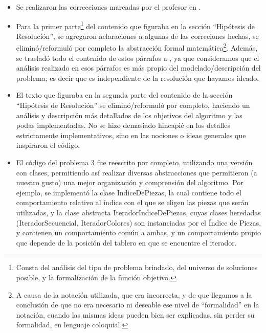 \documentclass[11pt, a4paper, twoside]{article}
\begin{document}
\begin{itemize}[leftmargin=+4em]

    \item Se realizaron las correcciones marcadas por el profesor en
.

    \item Para la primer parte\footnote{ Consta del análisis del tipo de
problema brindado, del universo de soluciones posible, y la formalización de la
función objetivo.} del contenido que figuraba en la sección ``Hipótesis de
Resolución'', se agregaron aclaraciones a algunas de las correciones hechas, se
eliminó/reformuló por completo la abstracción formal matemática\footnote{ A
causa de la notación utilizada, que era incorrecta, y de que llegamos a la
conclusión de que no era necesario ni deseable ese nivel de ``formalidad'' en la
notación, cuando las mismas ideas pueden bien ser explicadas, sin perder su
formalidad, en lenguaje coloquial.}. Además, se trasladó todo el contenido de
estos párrafos a , ya que consideramos que
el análisis realizado en esos párrafos es más propio del modelado/descripción
del problema; es decir que es independiente de la resolución que hayamos ideado.
    
    \item El texto que figuraba en la segunda parte del contenido de la sección
``Hipótesis de Resolución'' se eliminó/reformuló por completo, haciendo un
análisis y descripción más detallados de los objetivos del algoritmo y las podas
implementadas. No se hizo demasiado hincapié en los detalles estrictamente
implementativos, sino en las nociones o ideas generales que inspiraron el
código.

    \item El código del problema 3 fue reescrito por completo, utilizando una
versión con clases, permitiendo así realizar diversas abstracciones que
permitieron (a nuestro gusto) una mejor organización y comprensión del
algoritmo. Por ejemplo, se implementó la clase IndiceDePiezas, la cual contiene
todo el comportamiento relativo al índice con el que se eligen las piezas que
serán utilizadas, y la clase abstracta IteradorIndiceDePiezas, cuyas clases
heredadas (IteradorSecuencial, IteradorColores) son instanciadas por el Índice
de Piezas, y contienen un comportamiento común a ambas, y un comportamiento
propio que depende de la posición del tablero en que se encuentre el iterador.

\end{itemize}

\end{document}
